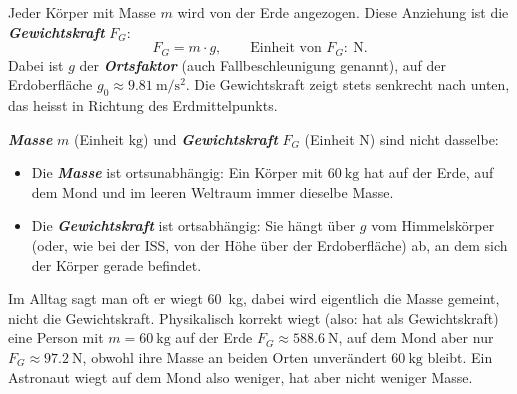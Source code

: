 \documentclass[addpoints,11pt,a4paper]{exam}
\begin{document}
\begin{theoriebox}[Die Gewichtskraft $F_G = m\cdot g$]
Jeder Körper mit Masse $m$ wird von der Erde angezogen. Diese Anziehung
ist die \textbf{\emph{Gewichtskraft}} $F_G$:
\[
  \boxed{F_G = m\cdot g}, \qquad \text{Einheit von } F_G\colon\ \si{\newton}.
\]
Dabei ist $g$ der \textbf{\emph{Ortsfaktor}} (auch Fallbeschleunigung
genannt), auf der Erdoberfläche $g_0\approx\SI{9.81}{\meter\per\second\squared}$.
Die Gewichtskraft zeigt stets senkrecht nach unten, das heisst in
Richtung des Erdmittelpunkts.

\textbf{\emph{Masse}} $m$ (Einheit $\si{\kilo\gram}$) und
\textbf{\emph{Gewichtskraft}} $F_G$ (Einheit $\si{\newton}$) sind nicht
dasselbe:
\begin{itemize}[leftmargin=1.2cm,itemsep=0.25em]
  \item Die \textbf{\emph{Masse}} ist ortsunabhängig: Ein Körper mit
  $\SI{60}{\kilo\gram}$ hat auf der Erde, auf dem Mond und im leeren
  Weltraum immer dieselbe Masse.
  \item Die \textbf{\emph{Gewichtskraft}} ist ortsabhängig: Sie hängt über
  $g$ vom Himmelskörper (oder, wie bei der ISS, von der Höhe über der
  Erdoberfläche) ab, an dem sich der Körper gerade befindet.
\end{itemize}
\end{theoriebox}

\begin{hinweisbox}
Im Alltag sagt man oft \glqq er wiegt \SI{60}{\kilo\gram}\grqq{}, dabei
wird eigentlich die Masse gemeint, nicht die Gewichtskraft. Physikalisch
korrekt wiegt (also: hat als Gewichtskraft) eine Person mit
$m=\SI{60}{\kilo\gram}$ auf der Erde $F_G\approx\SI{588.6}{\newton}$, auf
dem Mond aber nur $F_G\approx\SI{97.2}{\newton}$, obwohl ihre Masse an
beiden Orten unverändert $\SI{60}{\kilo\gram}$ bleibt. Ein Astronaut wiegt
auf dem Mond also weniger, hat aber nicht weniger Masse.
\end{hinweisbox}
\end{document}
